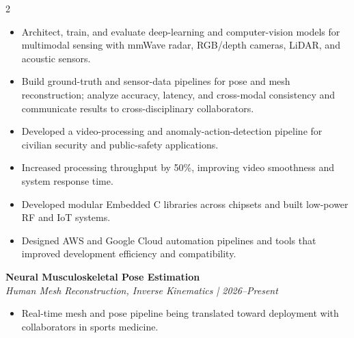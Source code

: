 \documentclass[9pt,letterpaper,ragged2e,withhyper]{../asset/altacv}
\begin{document}
\begin{paracol}{2}


\begin{itemize}
\item Architect, train, and evaluate deep-learning and computer-vision models for multimodal sensing with mmWave radar, RGB/depth cameras, LiDAR, and acoustic sensors.
\item Build ground-truth and sensor-data pipelines for pose and mesh reconstruction; analyze accuracy, latency, and cross-modal consistency and communicate results to cross-disciplinary collaborators.
\end{itemize}

\divider

\begin{itemize}
\item Developed a video-processing and anomaly-action-detection pipeline for civilian security and public-safety applications.
\item Increased processing throughput by 50\%, improving video smoothness and system response time.
\end{itemize}

\divider

\begin{itemize}
\item Developed modular Embedded C libraries across chipsets and built low-power RF and IoT systems.
\item Designed AWS and Google Cloud automation pipelines and tools that improved development efficiency and compatibility.
\end{itemize}


\textbf{Neural Musculoskeletal Pose Estimation}\\
\textit{Human Mesh Reconstruction, Inverse Kinematics | 2026--Present}\\
\begin{itemize}
\item Real-time mesh and pose pipeline being translated toward deployment with collaborators in sports medicine.
\end{itemize}


\end{paracol}
\end{document}
